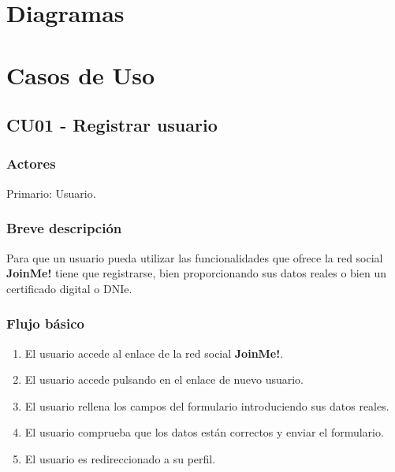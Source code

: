 \documentclass[12pt, a4paper, titlepage]{article}
\begin{document}
\section{Diagramas}




\section{Casos de Uso}

\subsection{CU01 - Registrar usuario}
\subsubsection{Actores}
Primario: Usuario.
\subsubsection{Breve descripción}
Para que un usuario pueda utilizar las funcionalidades que ofrece la red social \textbf{JoinMe!} tiene que registrarse, bien proporcionando sus datos reales o bien un certificado digital o DNIe.
\subsubsection{Flujo básico}
\begin{enumerate}
	\item El usuario accede al enlace de la red social \textbf{JoinMe!}.
	\item El usuario accede pulsando en el enlace de nuevo usuario.
	\item El usuario rellena los campos del formulario introduciendo sus datos reales.
	\item El usuario comprueba que los datos están correctos y enviar el formulario.
	\item El usuario es redireccionado a su perfil.
\end{enumerate}
\end{document}
